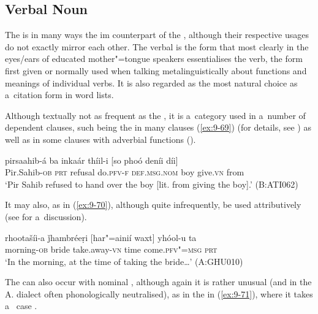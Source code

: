 \subsection{Verbal Noun}
\label{subsec:9-3-3}


The  is in many ways the im counterpart of the , although their respective usages do not exactly mirror each other. The verbal  is the form that most clearly in the eyes/ears of educated mother"=tongue speakers essentialises the verb, the form first given or normally used when talking metalinguistically about functions and meanings of individual verbs. It is also regarded as the most natural choice as a~citation form in word lists. 


Although textually not as frequent as the , it is a~category used in a~number of dependent clauses, such being the  in many  clauses (\ref{ex:9-69}) (for details, see ) as well as in some clauses with adverbial functions ().

\begin{exe}
\ex
\label{ex:9-69}
\gll pirsaahib-á ba inkaár thíil-i [so phoó deníi díi] \\
Pir.Sahib-\textsc{ob} \textsc{prt} refusal do.\textsc{pfv-f} \textsc{def.msg.nom} boy give.\textsc{vn} from \\
\glt `Pir Sahib refused to hand over the boy [lit. from giving the boy].' (B:ATI062)
\end{exe}

It may also, as in (\ref{ex:9-70}), although quite infrequently, be used attributively (see  for a~discussion).

\begin{exe}
\ex
\label{ex:9-70}
\gll rhootašíi-a ǰhambréeṛi [har"=ainií waxt] yhóol-u ta \\
morning-\textsc{ob} bride take.away-\textsc{vn} time come.\textsc{pfv"=msg} \textsc{prt} \\
\glt `In the morning, at the time of taking the bride{\ldots}' (A:GHU010)
\end{exe}

The  can also occur with nominal , although again it is rather unusual (and in the A. dialect often phonologically neutralised), as in the   in (\ref{ex:9-71}), where it takes a~ case . 

